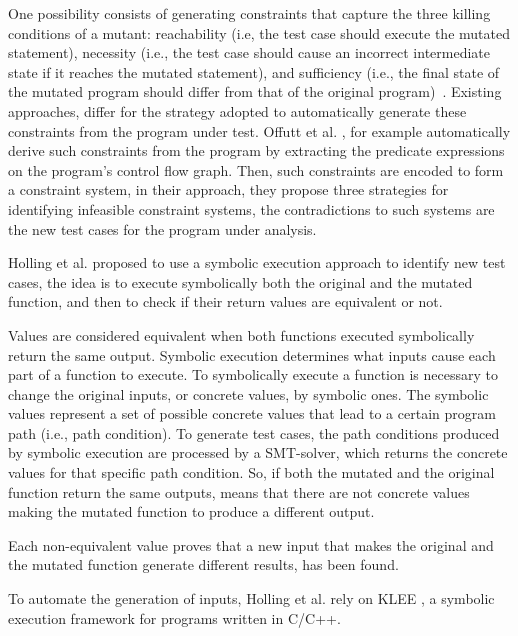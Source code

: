 One possibility consists of generating constraints that capture the three killing conditions of a mutant: reachability (i.e, the test case should execute the mutated statement), necessity (i.e., the test case should cause an incorrect intermediate state if it reaches the mutated statement), and sufficiency (i.e., the final state of the mutated program should differ from that of the original program)~\cite{offutt1997automatically}. Existing approaches, differ for the strategy adopted to automatically generate these constraints from the program under test.
Offutt et al. \cite{offutt1997automatically}, for example automatically derive such constraints from the program by extracting the predicate expressions on the program's control flow graph. Then, such constraints are encoded to form a constraint system, in their approach, they propose three strategies for identifying infeasible constraint systems, the contradictions to such systems are the new test cases for the program under analysis.

Holling et al. \cite{holling2016nequivack} proposed to use a symbolic execution approach to identify new test cases, the idea is to execute symbolically both the original and the mutated function, and then to check if their return values are equivalent or not. 

Values are considered equivalent when both functions executed symbolically return the same output. Symbolic execution determines what inputs cause each part of a function to execute. To symbolically execute a function is necessary to change the original inputs, or concrete values, by symbolic ones. The symbolic values represent a set of possible concrete values that lead to a certain program path (i.e., path condition). To generate test cases, the path conditions produced by symbolic execution are processed by a SMT-solver, which returns the concrete values for that specific path condition. 
So, if both the mutated and the original function return the same outputs, means that there are not concrete values making the mutated function to produce a different output.

Each non-equivalent value proves that a new input that makes the original and the mutated function generate different results, has been found. 

To automate the generation of inputs, Holling et al. \cite{holling2016nequivack} rely on KLEE \cite{cadar2008klee}, a symbolic execution framework for programs written in C/C++.

